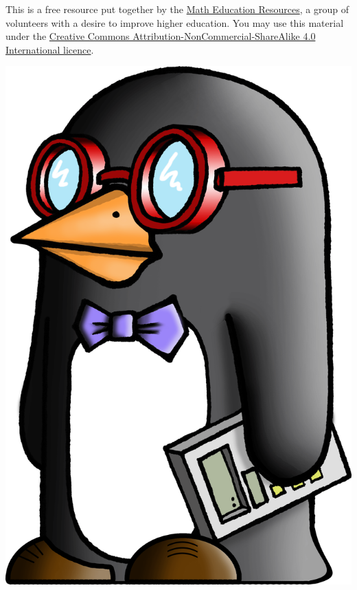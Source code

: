 \vfill

\begin{multicols}{2}
\hfill \begin{minipage}{0.45\textwidth}This is a free resource put together by the \href{http://www.math-education-resources.com}{Math Education Resources}, a group of volunteers with a desire to improve higher education. You may use this material under the \href{https://creativecommons.org/licenses/by-nc-sa/4.0/}{Creative Commons Attribution-NonCommercial-ShareAlike 4.0 International licence}.

\end{minipage}

\columnbreak

\begin{center}
\includegraphics[width=.14\textwidth]{MERS_penguin_left_min.png}
\end{center}
\end{multicols}
